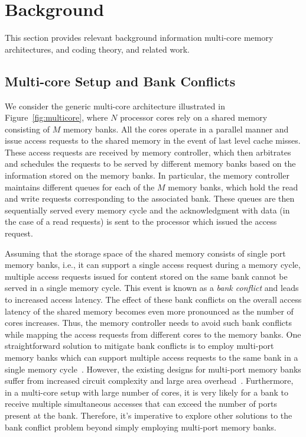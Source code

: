 \section{Background}
\label{sec:bg}

This section provides relevant background information multi-core memory architectures, and coding theory, and related work.

\subsection{Multi-core Setup and Bank Conflicts}
\label{sec:multi-core}

We consider the generic multi-core architecture illustrated in Figure~\ref{fig:multicore}, where $N$ processor cores rely on a shared memory consisting of $M$ memory banks. All the cores operate in a parallel manner and issue access requests to the shared memory in the event of last level cache misses. These access requests are received by memory controller, which then arbitrates and schedules the requests to be served by different memory banks based on the information stored on the memory banks. In particular, the memory controller maintains different queues for each of the $M$ memory banks, which hold the read and write requests corresponding to the associated bank. These queues are then sequentially served every memory cycle and the acknowledgment with data (in the case of a read requests) is sent to the processor which issued the access request. 

Assuming that the storage space of the shared memory consists of single port memory banks, i.e., it can support a single access request during a memory cycle, multiple access requests issued for content stored on the same bank cannot be served in a single memory cycle. This event is known as a \textit{bank conflict} and leads to increased access latency. The effect of these bank conflicts on the overall access latency of the shared memory becomes even more pronounced as the number of cores increases. Thus, the memory controller needs to avoid such bank conflicts while mapping the access requests from different cores to the memory banks. One straightforward solution to mitigate bank conflicts is to employ multi-port memory banks which can support multiple access requests to the same bank in a single memory cycle~\cite{patterson1997case}. However, the existing designs for multi-port memory banks suffer from increased circuit complexity and large area overhead~\cite{kapasi2003programmable}. Furthermore, in a multi-core setup with large number of cores, it is very likely for a bank to receive multiple simultaneous accesses that can exceed the number of ports present at the bank. Therefore, it's imperative to explore other solutions to the bank conflict problem beyond simply employing multi-port memory banks.

